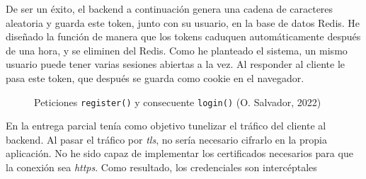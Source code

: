 \documentclass[11pt]{article}
\begin{document}
\begin{flushleft}
	De ser un éxito, el backend a continuación genera una cadena de caracteres aleatoria y guarda este token, junto con su usuario, en la base de datos Redis. He diseñado la función de manera que los tokens caduquen automáticamente después de una hora, y se eliminen del Redis. Como he planteado el sistema, un mismo usuario puede tener varias sesiones abiertas a la vez. Al responder al cliente le pasa este token, que después se guarda como cookie en el navegador.
	\linebreak
	
		\begin{figure}[htb]
			\centering
			\caption{Peticiones \texttt{register()} y consecuente \texttt{login()} (O. Salvador, 2022)}
		\end{figure}
	
	En la entrega parcial tenía como objetivo tunelizar el tráfico del cliente al backend. Al pasar el tráfico por \textit{\acrshort{tls}}, no sería necesario cifrarlo en la propia aplicación. No he sido capaz de implementar los certificados necesarios para que la conexión sea \textit{\acrshort{https}}. Como resultado, los credenciales son intercéptales
	\linebreak
	

\end{flushleft}
\end{document}
